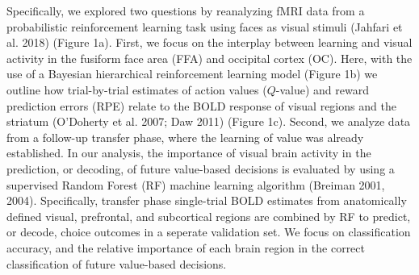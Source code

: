 \documentclass[]{article}
\begin{document}
Specifically, we explored two questions by reanalyzing fMRI data from a
probabilistic reinforcement learning task using faces as visual stimuli
(Jahfari et al. 2018) (Figure 1a). First, we focus on the interplay
between learning and visual activity in the fusiform face area (FFA) and
occipital cortex (OC). Here, with the use of a Bayesian hierarchical
reinforcement learning model (Figure 1b) we outline how trial-by-trial
estimates of action values (\(Q\)-value) and reward prediction errors
(RPE) relate to the BOLD response of visual regions and the striatum
(O'Doherty et al. 2007; Daw 2011) (Figure 1c). Second, we analyze data
from a follow-up transfer phase, where the learning of value was already
established. In our analysis, the importance of visual brain activity in
the prediction, or decoding, of future value-based decisions is
evaluated by using a supervised Random Forest (RF) machine learning
algorithm (Breiman 2001, 2004). Specifically, transfer phase
single-trial BOLD estimates from anatomically defined visual,
prefrontal, and subcortical regions are combined by RF to predict, or
decode, choice outcomes in a seperate validation set. We focus on
classification accuracy, and the relative importance of each brain
region in the correct classification of future value-based decisions.
\end{document}
